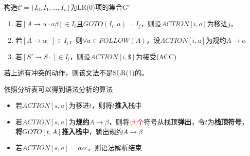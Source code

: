 \begin{myalgorithm}
构造$\mathcal{C}=\{I_0,I_1,\ldots,I_n\}$为LR(0)项的集合$G'$
\begin{enumerate}
	\item 若$[A\to\alpha\cdot a \beta]\in I_i$且$GOTO(I_i,a)=I_j$，则设$ACTION[i,a]$为移进$j$，
	\item 若$[A\to\alpha\cdot]\in I_i$，则$\forall a\in FOLLOW(A)$，设$ACTION[i,a]$为规约$A\to\alpha$
	\item 若$[S'\to S\cdot]\in I_i$，则设$ACTION[i,\$]$为接受(ACC)
\end{enumerate}
若上述有冲突的动作，则该文法不是SLR(1)的。

依照分析表可以得到语法分析的算法
\begin{itemize}
	\item 若$ACTION[s,a]$为移进$t$，则将$t$\textbf{推入}栈中
	\item 若$ACTION[s,a]$为\textbf{规约$A\to\beta$}，则将\textcolor{red}{$|\beta|$个}符号从栈顶\textbf{弹出}，令$t$为\textbf{栈顶符号}，\textbf{将$GOTO[t,A]$推入栈中}，输出规约$A\to\beta$
	\item 若$ACTION[s,a]=acc$，则语法解析结束
\end{itemize}
\end{myalgorithm}

